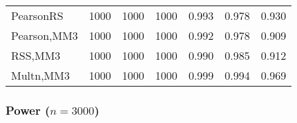 \documentclass[
]{article}
\begin{document}
\begin{table}[H]
{\begin{tabular}[t]{lrrrrrr}
\hspace{1em}PearsonRS & 1000 & 1000 & 1000 & 0.993 & 0.978 & 0.930\\
\hspace{1em}Pearson,MM3 & 1000 & 1000 & 1000 & 0.992 & 0.978 & 0.909\\
\hspace{1em}RSS,MM3 & 1000 & 1000 & 1000 & 0.990 & 0.985 & 0.912\\
\hspace{1em}Multn,MM3 & 1000 & 1000 & 1000 & 0.999 & 0.994 & 0.969\\
\bottomrule
\end{tabular}}
\end{table}

\hypertarget{power-n3000-2}{%
\subsubsection{\texorpdfstring{Power
(\(n=3000\))}{Power (n=3000)}}\label{power-n3000-2}}
\end{document}
